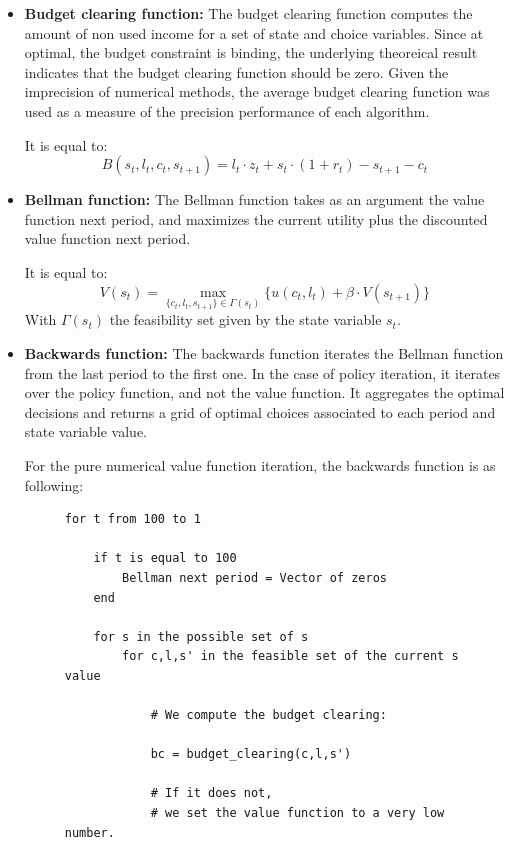 \documentclass{article}
\begin{document}
\begin{itemize}
    \item \textbf{Budget clearing function: } 
    The budget clearing function computes the amount of non used income for a 
    set of state and choice variables. Since at optimal, the budget constraint is binding, 
    the underlying theoreical result indicates that the budget clearing function should be 
    zero. Given the imprecision of numerical methods, the average budget clearing function was used 
    as a measure of the precision performance of each algorithm.

    It is equal to: 
    $$B(s_{t},l_{t},c_{t},s_{t+1})=l_{t} \cdot z_{t} + s_{t}\cdot(1+r_{t}) - s_{t+1} - c_{t}$$

    \item \textbf{Bellman function: }
    The Bellman function takes as an argument the value function next period, 
    and maximizes the current utility plus the discounted value function next period. 

    It is equal to: 
    $$V(s_{t}) = \max_{\{c_{t},l_{t},s_{t+1}\}\in \Gamma(s_{t})} \{u(c_{t},l_{t}) + \beta \cdot V(s_{t+1})\}$$
    With $\Gamma(s_{t})$ the feasibility set given by the state variable $s_{t}$.

    \item \textbf{Backwards function: }
    The backwards function iterates the Bellman function from the last period 
    to the first one. In the case of policy iteration, it iterates over the 
    policy function, and not the value function. It aggregates the optimal decisions 
    and returns a grid of optimal choices associated to each period and state variable value.

    For the pure numerical value function iteration, the backwards function is
    as following: 
    \begin{figure}[H]
    \begin{lstlisting}[basicstyle=\small]
for t from 100 to 1

    if t is equal to 100
        Bellman next period = Vector of zeros
    end

    for s in the possible set of s
        for c,l,s' in the feasible set of the current s value
            
            # We compute the budget clearing: 

            bc = budget_clearing(c,l,s') 

            # If it does not,
            # we set the value function to a very low number.
            

\end{lstlisting}
\end{figure}
\end{itemize}
\end{document}
